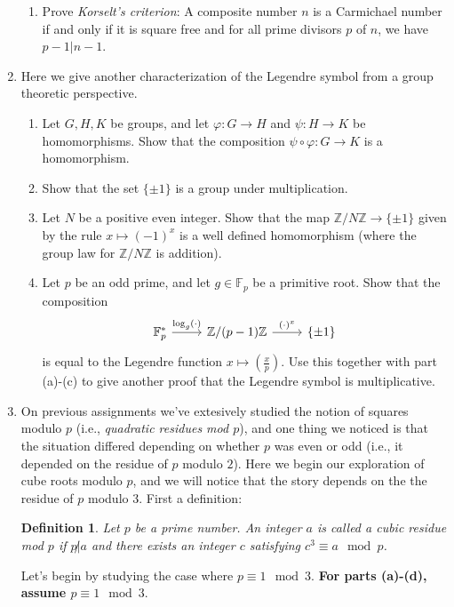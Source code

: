 \documentclass[11pt]{article}
\newtheorem{definition}{Definition}
\newcommand{\bF}{\mathbb{F}}
\newcommand{\bZ}{\mathbb{Z}}
\begin{document}
\begin{enumerate}
{\begin{enumerate}
{    }
    \item{
    Prove \textit{Korselt's criterion}: A composite number $n$ is a Carmichael number if and only if it is square free and for all prime divisors $p$ of $n$, we have $p-1|n-1$.
    }
  \end{enumerate}
  }
  \item{
  Here we give another characterization of the Legendre symbol from a group theoretic perspective.
  \begin{enumerate}
    \item{
    Let $G,H,K$ be groups, and let $\varphi:G\to H$ and $\psi:H\to K$ be homomorphisms.  Show that the composition $\psi\circ\varphi:G\to K$ is a homomorphism.
    }
    \item{
    Show that the set $\{\pm1\}$ is a group under multiplication.
    }
    \item{
    Let $N$ be a positive even integer.  Show that the map $\bZ/N\bZ\to\{\pm1\}$ given by the rule $x\mapsto (-1)^x$ is a well defined homomorphism (where the group law for $\bZ/N\bZ$ is addition).
    }
    \item{
    Let $p$ be an odd prime, and let $g\in\bF_p$ be a primitive root.  Show that the composition
    \[
    \begin{tikzcd}
      \bF_p^*\ar[r,"\log_g(\cdot)"]&\bZ/(p-1)\bZ\ar[r,"(\cdot)^x"]&\{\pm1\}
    \end{tikzcd}
    \]
    is equal to the Legendre function $x\mapsto\left(\frac{x}{p}\right)$.  Use this together with part (a)-(c) to give another proof that the Legendre symbol is multiplicative.
    }
  \end{enumerate}
  }
  \item{
  On previous assignments we've extesively studied the notion of squares modulo $p$ (i.e., \textit{quadratic residues mod $p$}), and one thing we noticed is that the situation differed depending on whether $p$ was even or odd (i.e., it depended on the residue of $p$ modulo $2$).  Here we begin our exploration of cube roots modulo $p$, and we will notice that the story depends on the the residue of $p$ modulo 3.  First a definition:
  \begin{definition}
    Let $p$ be a prime number.  An integer $a$ is called a \textit{cubic residue mod $p$} if $p\not|a$ and there exists an integer $c$ satisfying $c^3\equiv a\mod p$.
  \end{definition}
  Let's begin by studying the case where $p\equiv 1\mod 3$.  \textbf{For parts (a)-(d), assume $p\equiv1\mod 3$}.
  \begin{enumerate}

\end{enumerate}}
\end{enumerate}
\end{document}
